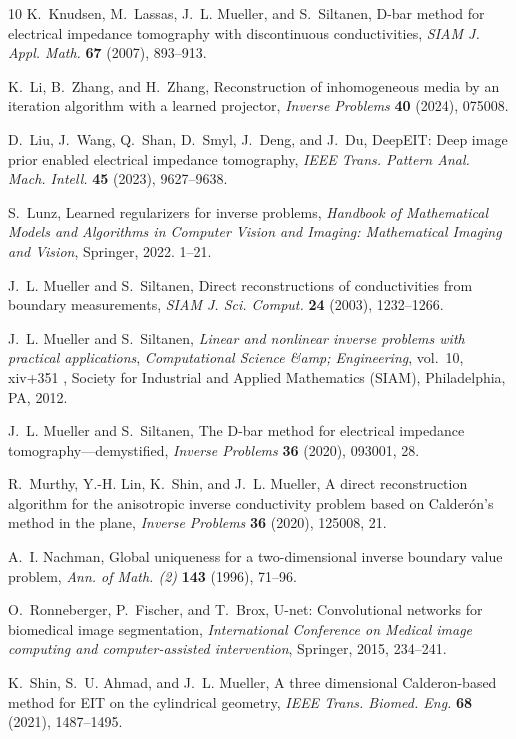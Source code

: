 \documentclass[11pt]{article}
\begin{document}
\begin{thebibliography}{10}
	K.~Knudsen, M.~Lassas, J.~L. Mueller, and S.~Siltanen, D-bar method for
	electrical impedance tomography with discontinuous conductivities,
	\textit{SIAM J. Appl. Math.} \textbf{67} (2007), 893--913.
	
	K.~Li, B.~Zhang, and H.~Zhang, Reconstruction of inhomogeneous media by an
	iteration algorithm with a learned projector, \textit{Inverse Problems}
	\textbf{40} (2024), 075008.
	
	D.~Liu, J.~Wang, Q.~Shan, D.~Smyl, J.~Deng, and J.~Du, {DeepEIT}: Deep image
	prior enabled electrical impedance tomography, \textit{IEEE Trans. Pattern
		Anal. Mach. Intell.} \textbf{45} (2023), 9627--9638.
	
	S.~Lunz, Learned regularizers for inverse problems, \textit{Handbook of
		Mathematical Models and Algorithms in Computer Vision and Imaging:
		Mathematical Imaging and Vision}, Springer, 2022. 1--21.
	
	J.~L. Mueller and S.~Siltanen, Direct reconstructions of conductivities from
	boundary measurements, \textit{SIAM J. Sci. Comput.} \textbf{24} (2003),
	1232--1266.
	
	J.~L. Mueller and S.~Siltanen, \textit{Linear and nonlinear inverse problems
		with practical applications}, \textit{Computational Science \&amp;
		Engineering}, vol.~10, xiv+351 , Society for Industrial and Applied
	Mathematics (SIAM), Philadelphia, PA, 2012.
	
	J.~L. Mueller and S.~Siltanen, The {D}-bar method for electrical impedance
	tomography---demystified, \textit{Inverse Problems} \textbf{36} (2020),
	093001, 28.
	
	R.~Murthy, Y.-H. Lin, K.~Shin, and J.~L. Mueller, A direct reconstruction
	algorithm for the anisotropic inverse conductivity problem based on
	{C}alder\'on's method in the plane, \textit{Inverse Problems} \textbf{36}
	(2020), 125008, 21.
	
	A.~I. Nachman, Global uniqueness for a two-dimensional inverse boundary value
	problem, \textit{Ann. of Math. (2)} \textbf{143} (1996), 71--96.
	
	O.~Ronneberger, P.~Fischer, and T.~Brox, U-net: Convolutional networks for
	biomedical image segmentation, \textit{International Conference on Medical
		image computing and computer-assisted intervention}, Springer, 2015,
	234--241.
	
	K.~Shin, S.~U. Ahmad, and J.~L. Mueller, A three dimensional {C}alderon-based
	method for {EIT} on the cylindrical geometry, \textit{IEEE Trans. Biomed.
		Eng.} \textbf{68} (2021), 1487--1495.
	

\end{thebibliography}
\end{document}
